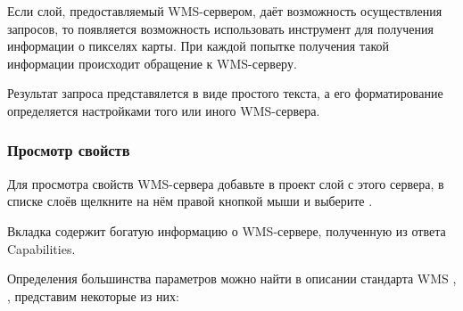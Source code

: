 Если слой, предоставляемый WMS-сервером, даёт возможность осуществления
запросов, то появляется возможность использовать инструмент
 для получения информации о
пикселях карты. При каждой попытке получения такой информации происходит
обращение к WMS-серверу.

Результат запроса представялется в виде простого текста,
а его форматирование определяется настройками того или иного WMS-сервера.

\subsubsection{Просмотр
свойств}\label{sec:ogc-wms-properties}

Для просмотра свойств WMS-сервера добавьте в проект слой с этого сервера, в
списке слоёв щелкните на нём правой кнопкой мыши и выберите .

\label{sec:ogc-wms-properties-metadata}

Вкладка  содержит богатую информацию о
WMS-сервере, полученную из ответа Capabilities.

Определения большинства параметров можно найти в описании стандарта WMS
\cite{OGCWMS010101web}, \cite{OGCWMS010300web}, представим некоторые из них:

